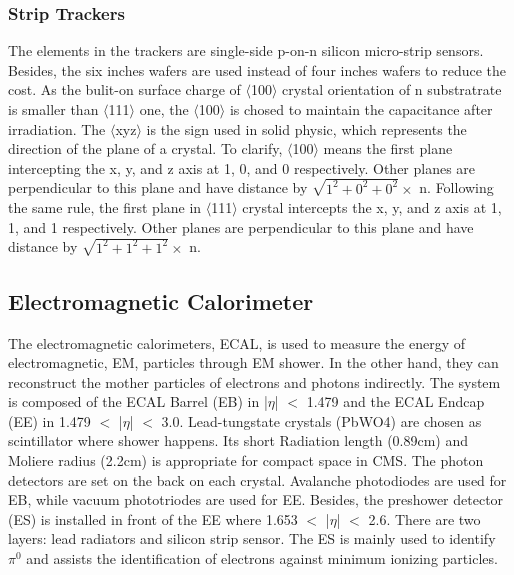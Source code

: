 \subsubsection{Strip Trackers}
The elements in the trackers are single-side p-on-n silicon micro-strip sensors. 
Besides, the six inches wafers are used instead of four inches wafers to reduce the cost. 
As the bulit-on surface charge of $\langle$100$\rangle$ crystal orientation of n substratrate is smaller than $\langle$111$\rangle$ one, 
the $\langle$100$\rangle$ is chosed to maintain the capacitance after irradiation. The $\langle$xyz$\rangle$ is the sign used in solid physic, which represents the direction of the plane of a crystal. To clarify, $\langle$100$\rangle$ means the first plane intercepting the x, y, and z axis at 1, 0, and 0 respectively. Other planes are perpendicular to this plane and have distance by $\sqrt{1^2+0^2+0^2} \times$ n. Following the same rule, the first plane in $\langle$111$\rangle$ crystal intercepts the x, y, and z axis at 1, 1, and 1 respectively. Other planes are perpendicular to this plane and have distance by $\sqrt{1^2+1^2+1^2} \times$ n.

\subsection{Electromagnetic Calorimeter} 
The electromagnetic calorimeters, ECAL, is used to measure the energy of electromagnetic, EM, particles through EM shower. 
In the other hand, they can reconstruct the mother particles of electrons and photons indirectly.
The system is composed of the ECAL Barrel (EB) in |$\eta $| $<$ 1.479 and the ECAL Endcap (EE) in 1.479 $<$ |$\eta $| $<$ 3.0. 
Lead-tungstate crystals (PbWO4) are chosen as scintillator where shower happens.
Its short Radiation length (0.89cm) and Moliere radius (2.2cm) is appropriate for compact space in CMS.
The photon detectors are set on the back on each crystal. 
Avalanche photodiodes are used for EB, while vacuum phototriodes are used for EE. 
Besides, the preshower detector (ES) is installed in front of the EE where 1.653 $<$ |$\eta $| $<$ 2.6. 
There are two layers: lead radiators and silicon strip sensor.
The ES is mainly used to identify $\pi ^0$ and assists the identification of electrons against minimum ionizing particles.
 

